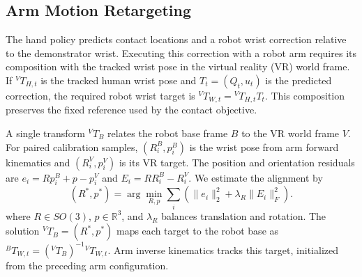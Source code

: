 \subsection{Arm Motion Retargeting}
\label{sec:cart-arm}

The hand policy predicts contact locations and a robot wrist correction relative to the demonstrator wrist. Executing this correction with a robot arm requires its composition with the tracked wrist pose in the virtual reality (VR) world frame. If ${}^{V}T_{H,t}$ is the tracked human wrist pose and $T_t=(Q_t,u_t)$ is the predicted correction, the required robot wrist target is ${}^{V}T_{W,t}={}^{V}T_{H,t}T_t$. This composition preserves the fixed reference used by the contact objective.

A single transform \({}^{V}T_B\) relates the robot base frame $B$ to the VR world frame $V$. For paired calibration samples, $(R_i^B,p_i^B)$ is the wrist pose from arm forward kinematics and $(R_i^V,p_i^V)$ is its VR target. The position and orientation residuals are $e_i=Rp_i^B+p-p_i^V$ and $E_i=RR_i^B-R_i^V$. We estimate the alignment by
\begin{equation}
    (R^*,p^*)=\arg\min_{R,p}\sum_i
        \left(\|e_i\|_2^2+\lambda_R\|E_i\|_F^2\right).
    \label{eq:cart-vr-base}
\end{equation}
where $R\in SO(3)$, $p\in\mathbb R^3$, and $\lambda_R$ balances translation and rotation. The solution \({}^{V}T_B=(R^*,p^*)\) maps each target to the robot base as \({}^{B}T_{W,t}=({}^{V}T_B)^{-1}{}^{V}T_{W,t}\). Arm inverse kinematics tracks this target, initialized from the preceding arm configuration.


